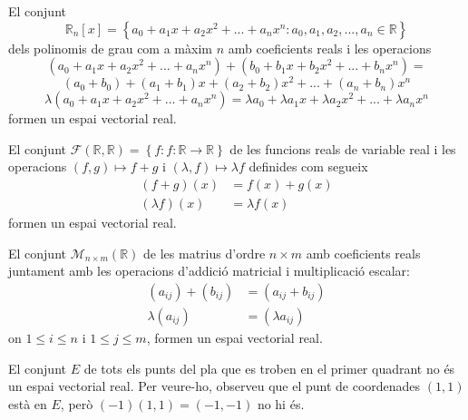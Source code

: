 \begin{exemple}
El conjunt 
\begin{equation*}
\mathbb{R}_{n}\left[ x\right] =\left\{
a_{0}+a_{1}x+a_{2}x^{2}+...+a_{n}x^{n}:a_{0},a_{1},a_{2},...,a_{n}\in 
\mathbb{R}\right\}
\end{equation*}%
dels polinomis de grau com a màxim $n$ amb coeficients reals i les
operacions%
\begin{equation*}
(a_{0}+a_{1}x+a_{2}x^{2}+...+a_{n}x^{n})+(b_{0}+b_{1}x+b_{2}x^{2}+...+b_{n}x^{n})=
\end{equation*}%
\begin{equation*}
(a_{0}+b_{0})+(a_{1}+b_{1})x+(a_{2}+b_{2})x^{2}+...+(a_{n}+b_{n})x^{n}
\end{equation*}%
\begin{equation*}
\lambda (a_{0}+a_{1}x+a_{2}x^{2}+...+a_{n}x^{n})=\lambda a_{0}+\lambda
a_{1}x+\lambda a_{2}x^{2}+...+\lambda a_{n}x^{n}
\end{equation*}%
formen un espai vectorial real.
\end{exemple}

\begin{exemple}
El conjunt $\mathcal{F}(\mathbb{R},\mathbb{R})=\left\{ f:f:\mathbb{R}%
\rightarrow \mathbb{R}\right\} $ de les funcions reals de variable real i
les operacions $(f,g)\longmapsto f+g$ i $(\lambda ,f)\longmapsto \lambda f$
definides com segueix%
\begin{align*}
(f+g)(x) &=f(x)+g(x) \\
(\lambda f)(x) &=\lambda f(x)
\end{align*}%
formen un espai vectorial real.
\end{exemple}

\begin{exemple}
El conjunt $\mathcal{M}_{n\times m}(\mathbb{R})$ de les matrius d’ordre $%
n\times m$ amb coeficients reals juntament amb les operacions d'addició
matricial i multiplicació escalar:%
\begin{align*}
(a_{ij})+(b_{ij}) &=(a_{ij}+b_{ij}) \\
\lambda (a_{ij}) &=(\lambda a_{ij})
\end{align*}%
on $1\leq i\leq n$ i $1\leq j\leq m$, formen un espai vectorial real.
\end{exemple}

\begin{exemple}
El conjunt $E$ de tots els punts del pla que es troben en el primer
quadrant no és un espai vectorial real. Per veure-ho, observeu que
el punt de coordenades $(1,1)$ està en $E$, però $(-1)(1,1)=(-1,-1)$ no
hi és.
\end{exemple}

